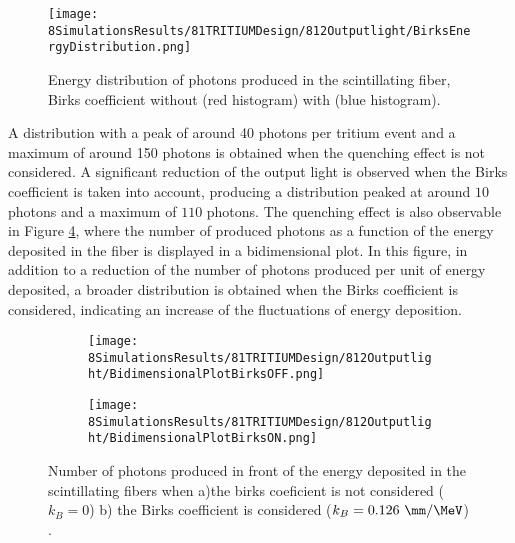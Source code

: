 \begin{figure}[h]
\centering
\texttt{[image: 8SimulationsResults/81TRITIUMDesign/812Outputlight/BirksEnergyDistribution.png]}
\caption{Energy distribution of photons produced in the scintillating fiber, Birks coefficient without (red histogram) with (blue histogram)\cite{SimulationPaperCarlos}.\label{fig:BirksEffectinEnergyDistribution}}
\end{figure}  

A distribution with a peak of around 40 photons per tritium event and a maximum of around 150 photons is obtained when the quenching effect is not considered. A significant reduction of the output light is observed when the Birks coefficient is taken into account, producing a distribution peaked at around $10$ photons and a maximum of $110$ photons. The quenching effect is also observable in Figure \ref{fig:2DimPlotBirks}, where the number of produced photons as a function of the energy deposited in the fiber is displayed in a bidimensional plot. In this figure, in addition to a reduction of the number of photons produced per unit of energy deposited, a broader distribution is obtained when the Birks coefficient is considered, indicating an increase of the fluctuations of energy deposition.

\begin{figure}
\centering
    \begin{subfigure}[b]{0.4\textwidth}
    \centering
    \texttt{[image: 8SimulationsResults/81TRITIUMDesign/812Outputlight/BidimensionalPlotBirksOFF.png]}  
    \caption{\label{subfig:2DimPlotNoBirks}}
    \end{subfigure}
    \hfill
    \begin{subfigure}[b]{0.4\textwidth}
    \centering
    \texttt{[image: 8SimulationsResults/81TRITIUMDesign/812Outputlight/BidimensionalPlotBirksON.png]}  
    \caption{\label{subfig:2DimPlotBirks}}
    \end{subfigure}
 \caption{Number of photons produced in front of the energy deposited in the scintillating fibers when a)the birks coeficient is not considered ($k_B=0$) b) the Birks coefficient is considered ($k_B=0.126~\mm/\MeV$) \cite{SimulationPaperCarlos}.}
 \label{fig:2DimPlotBirks}
\end{figure}